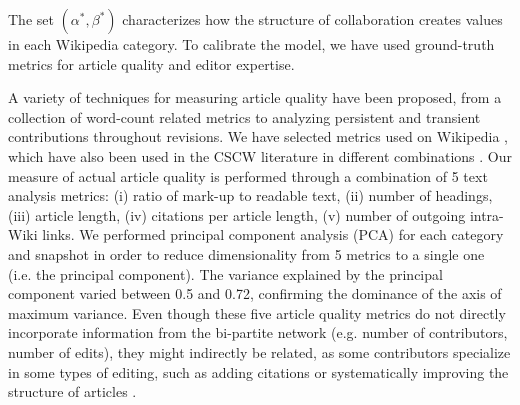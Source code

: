 The set $(\alpha^*,\beta^*)$ characterizes how the structure of collaboration creates values in each Wikipedia category. To calibrate the model, we have used ground-truth metrics for article quality and editor expertise. 

A variety of techniques for measuring article quality have been proposed, from a collection of word-count related metrics \cite{blumenstock2008sizematters} to analyzing persistent and transient contributions throughout revisions\cite{woehner2009}. We have selected metrics used on Wikipedia \cite{wang2013tell,klein}, which have also been used in the CSCW literature in different combinations \cite{kane2011} \cite{keegan2012}. Our measure of actual article quality is performed through a combination of 5 text analysis metrics: (i) ratio of mark-up to readable text, (ii) number of headings, (iii) article length, (iv) citations per article length, (v) number of outgoing intra-Wiki links. We performed principal component analysis (PCA) for each category and snapshot in order to reduce dimensionality from 5 metrics to a single one (i.e. the principal component). The variance explained by the principal component varied between 0.5 and 0.72, confirming the dominance of the axis of maximum variance. Even though these five article quality metrics do not directly incorporate information from the bi-partite network (e.g. number of contributors, number of edits), they might indirectly be related, as some contributors specialize in some types of editing, such as adding citations or systematically improving the structure of articles \cite{}.

